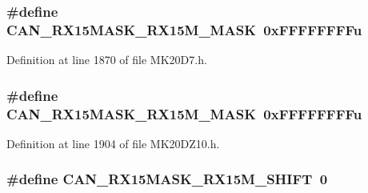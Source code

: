 \subsubsection[{\texorpdfstring{C\+A\+N\+\_\+\+R\+X15\+M\+A\+S\+K\+\_\+\+R\+X15\+M\+\_\+\+M\+A\+SK}{CAN_RX15MASK_RX15M_MASK}}]{\setlength{\rightskip}{0pt plus 5cm}\#define C\+A\+N\+\_\+\+R\+X15\+M\+A\+S\+K\+\_\+\+R\+X15\+M\+\_\+\+M\+A\+SK~0x\+F\+F\+F\+F\+F\+F\+F\+Fu}\hypertarget{group___c_a_n___register___masks_gaf81f33076f662d5f4c737076e36e93b7}{}\label{group___c_a_n___register___masks_gaf81f33076f662d5f4c737076e36e93b7}


Definition at line 1870 of file M\+K20\+D7.\+h.

\subsubsection[{\texorpdfstring{C\+A\+N\+\_\+\+R\+X15\+M\+A\+S\+K\+\_\+\+R\+X15\+M\+\_\+\+M\+A\+SK}{CAN_RX15MASK_RX15M_MASK}}]{\setlength{\rightskip}{0pt plus 5cm}\#define C\+A\+N\+\_\+\+R\+X15\+M\+A\+S\+K\+\_\+\+R\+X15\+M\+\_\+\+M\+A\+SK~0x\+F\+F\+F\+F\+F\+F\+F\+Fu}\hypertarget{group___c_a_n___register___masks_gaf81f33076f662d5f4c737076e36e93b7}{}\label{group___c_a_n___register___masks_gaf81f33076f662d5f4c737076e36e93b7}


Definition at line 1904 of file M\+K20\+D\+Z10.\+h.

\subsubsection[{\texorpdfstring{C\+A\+N\+\_\+\+R\+X15\+M\+A\+S\+K\+\_\+\+R\+X15\+M\+\_\+\+S\+H\+I\+FT}{CAN_RX15MASK_RX15M_SHIFT}}]{\setlength{\rightskip}{0pt plus 5cm}\#define C\+A\+N\+\_\+\+R\+X15\+M\+A\+S\+K\+\_\+\+R\+X15\+M\+\_\+\+S\+H\+I\+FT~0}\hypertarget{group___c_a_n___register___masks_ga1420efdd894578fe2a31563c25b58e59}{}\label{group___c_a_n___register___masks_ga1420efdd894578fe2a31563c25b58e59}


